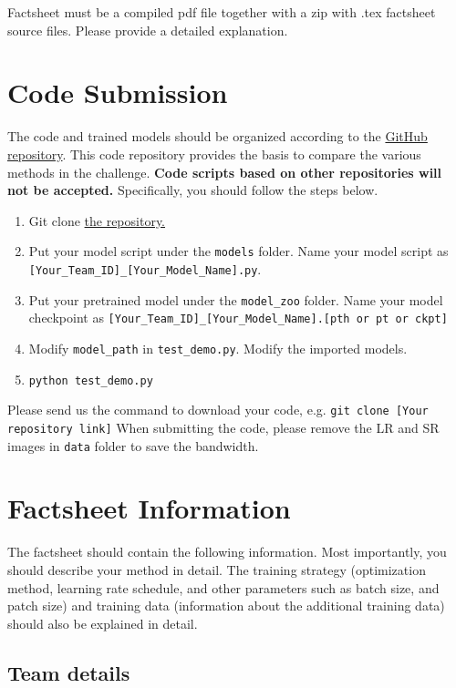 \documentclass[10pt,twocolumn,letterpaper]{article}
\begin{document}
\noindent Factsheet must be a compiled pdf file together with a zip with .tex factsheet source files. Please provide a detailed explanation.


\section{Code Submission}

The code and trained models should be organized according to the \href{https://github.com/Amazingren/NTIRE2025_ESR}{GitHub repository}. This code repository provides the basis to compare the various methods in the challenge. \textbf{Code scripts based on other repositories will not be accepted.} Specifically, you should follow the steps below.
\begin{enumerate}
    \item Git clone \href{https://github.com/Amazingren/NTIRE2025_ESR}{the repository.}
    \item Put your model script under the \texttt{models} folder. Name your model script as \texttt{[Your\_Team\_ID]\_[Your\_Model\_Name].py}.
    \item Put your pretrained model under the \texttt{model\_zoo} folder. Name your model checkpoint as \texttt{[Your\_Team\_ID]\_[Your\_Model\_Name].[pth or pt or ckpt]}
    \item Modify \texttt{model\_path} in \texttt{test\_demo.py}. Modify the imported models.
    \item \texttt{python test\_demo.py}
\end{enumerate}
Please send us the command to download your code, e.g. \texttt{git clone [Your repository link]}
When submitting the code, please remove the LR and SR images in \texttt{data} folder to save the bandwidth.

\section{Factsheet Information}

The factsheet should contain the following information. Most importantly, you should describe your method in detail. The training strategy (optimization method, learning rate schedule, and other parameters such as batch size, and patch size) and training data (information about the additional training data) should also be explained in detail.

\subsection{Team details}
\end{document}
